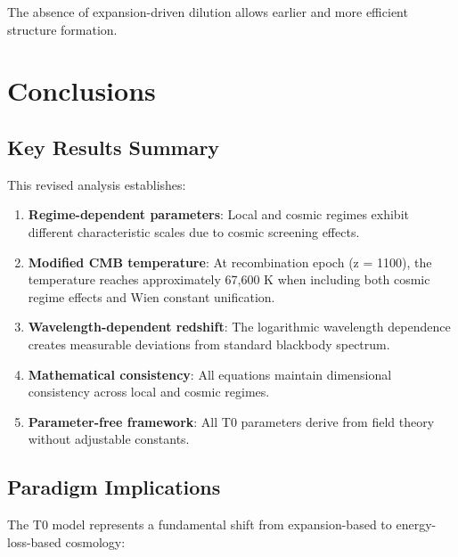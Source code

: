 \documentclass[12pt,a4paper]{article}
\begin{document}
	The absence of expansion-driven dilution allows earlier and more efficient structure formation.
	
	\section{Conclusions}
	\label{sec:conclusions}
	
	\subsection{Key Results Summary}
	\label{subsec:key_results}
	
	This revised analysis establishes:
	
	\begin{enumerate}
		\item \textbf{Regime-dependent parameters}: Local and cosmic regimes exhibit different characteristic scales due to cosmic screening effects.
		
		\item \textbf{Modified CMB temperature}: At recombination epoch (z = 1100), the temperature reaches approximately 67,600 K when including both cosmic regime effects and Wien constant unification.
		
		\item \textbf{Wavelength-dependent redshift}: The logarithmic wavelength dependence creates measurable deviations from standard blackbody spectrum.
		
		\item \textbf{Mathematical consistency}: All equations maintain dimensional consistency across local and cosmic regimes.
		
		\item \textbf{Parameter-free framework}: All T0 parameters derive from field theory without adjustable constants.
	\end{enumerate}
	
	\subsection{Paradigm Implications}
	\label{subsec:paradigm_implications}
	
	The T0 model represents a fundamental shift from expansion-based to energy-loss-based cosmology:
	
\end{document}
